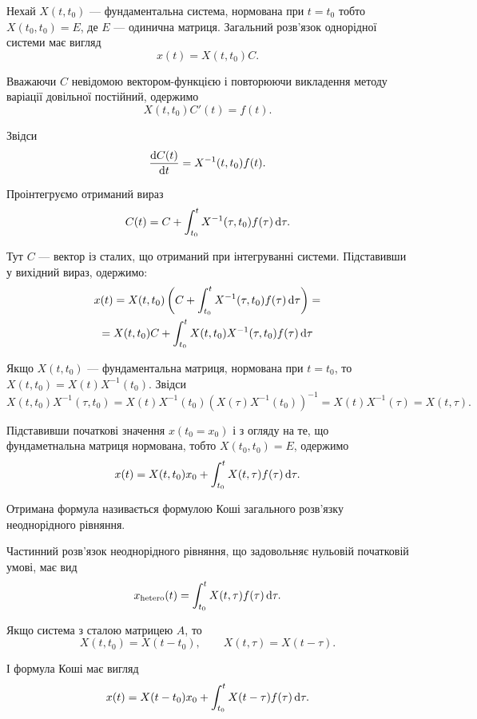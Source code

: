 Нехай $X(t, t_0)$ --- фундаментальна система, нормована при $t = t_0$ тобто $X(t_0, t_0) = E$, де $E$ --- одинична матриця. Загальний розв'язок однорідної системи має вигляд
\begin{equation*}
	x(t) = X(t, t_0) C.
\end{equation*}

Вважаючи $C$ невідомою вектором-функцією і повторюючи викладення методу варіації довільної постійний, одержимо
\begin{equation*}
	X(t, t_0) C'(t) = f(t).
\end{equation*}

Звідси
\begin{equation*}
	\frac{\mathop{}\!\mathrm{d} C(t)}{\mathop{}\!\mathrm{d} t} = X^{-1}(t, t_0) f(t).
\end{equation*}

Проінтегруємо отриманий вираз
\begin{equation*}
	C(t) = C + \int_{t_0}^t X^{-1}(\tau, t_0) f(\tau) \mathop{}\!\mathrm{d} \tau.
\end{equation*}

Тут $C$ --- вектор із сталих, що отриманий при інтегруванні системи. Підставивши у вихідний вираз, одержимо:
\begin{multline*}
	x(t) = X(t, t_0) \left( C + \int_{t_0}^t X^{-1}(\tau, t_0) f(\tau) \mathop{}\!\mathrm{d} \tau \right) = \\
	= X(t, t_0) C + \int_{t_0}^t X(t, t_0) X^{-1}(\tau, t_0) f(\tau) \mathop{}\!\mathrm{d} \tau 
\end{multline*}
  
Якщо $X(t, t_0)$ --- фундаментальна матриця, нормована при $t = t_0$, то $X(t, t_0) = X(t) X^{-1} (t_0)$. Звідси
\begin{equation*}
	X(t, t_0) X^{-1}(\tau, t_0) = X(t) X^{-1}(t_0) \left( X(\tau) X^{-1}(t_0) \right)^{-1} = X(t) X^{-1} (\tau) = X(t, \tau).
\end{equation*}
 
Підставивши початкові значення $x(t_0 = x_0)$ і з огляду на те, що фундаметнальна матриця нормована, тобто $X(t_0, t_0) = E$, одержимо
\begin{equation*}
	x(t) = X(t, t_0) x_0 + \int_{t_0}^t X(t, \tau) f(\tau) \mathop{}\!\mathrm{d} \tau.
\end{equation*}

Отримана формула називається формулою Коші загального розв'язку неоднорідного рівняння. \parvskip

Частинний розв'язок неоднорідного рівняння, що задовольняє нульовій початковій умові, має вид
\begin{equation*}
	x_{\text{hetero}}(t) = \int_{t_0}^t X(t, \tau) f(\tau) \mathop{}\!\mathrm{d} \tau.
\end{equation*}

Якщо система з сталою матрицею $A$, то
\begin{equation*}
	X(t, t_0) = X(t - t_0), \qquad X(t, \tau) = X(t - \tau).
\end{equation*}

І формула Коші має вигляд
\begin{equation*}
	x(t) = X(t - t_0) x_0 + \int_{t_0}^t X(t - \tau) f(\tau) \mathop{}\!\mathrm{d} \tau.
\end{equation*}
